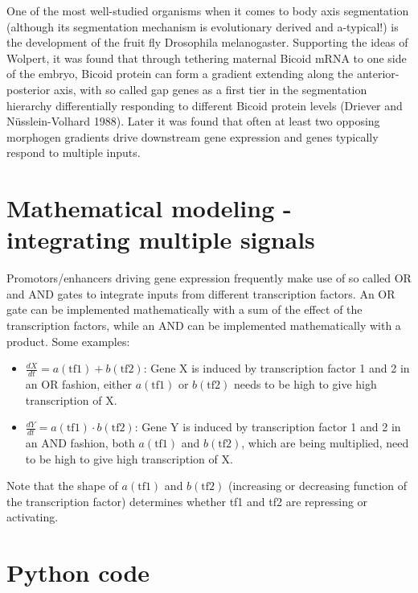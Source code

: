 \documentclass[
  letterpaper,
  DIV=11,
  numbers=noendperiod]{scrreprt}
\providecommand{\tightlist}{%
  \setlength{\itemsep}{0pt}\setlength{\parskip}{0pt}}\usepackage{longtable,booktabs,array}
\theoremstyle{definition}
\theoremstyle{remark}
\begin{document}
One of the most well-studied organisms when it comes to body axis
segmentation (although its segmentation mechanism is evolutionary
derived and a-typical!) is the development of the fruit fly Drosophila
melanogaster. Supporting the ideas of Wolpert, it was found that through
tethering maternal Bicoid mRNA to one side of the embryo, Bicoid protein
can form a gradient extending along the anterior-posterior axis, with so
called gap genes as a first tier in the segmentation hierarchy
differentially responding to different Bicoid protein levels (Driever
and Nüsslein-Volhard 1988). Later it was found that often at least two
opposing morphogen gradients drive downstream gene expression and genes
typically respond to multiple inputs.

\section{Mathematical modeling - integrating multiple
signals}\label{mathematical-modeling---integrating-multiple-signals}

Promotors/enhancers driving gene expression frequently make use of so
called OR and AND gates to integrate inputs from different transcription
factors. An OR gate can be implemented mathematically with a sum of the
effect of the transcription factors, while an AND can be implemented
mathematically with a product. Some examples:

\begin{itemize}
\tightlist
\item
  \(\frac{dX}{dt} = a(\text{tf1}) + b(\text{tf2})\): Gene X is induced
  by transcription factor 1 and 2 in an OR fashion, either
  \(a(\text{tf1})\) or \(b(\text{tf2})\) needs to be high to give high
  transcription of X.
\item
  \(\frac{dY}{dt} = a(\text{tf1})\cdot b(\text{tf2})\): Gene Y is
  induced by transcription factor 1 and 2 in an AND fashion, both
  \(a(\text{tf1})\) and \(b(\text{tf2})\), which are being multiplied,
  need to be high to give high transcription of X.
\end{itemize}

Note that the shape of \(a(\text{tf1})\) and \(b(\text{tf2})\)
(increasing or decreasing function of the transcription factor)
determines whether tf1 and tf2 are repressing or activating.

\section{Python code}\label{python-code}
\end{document}
